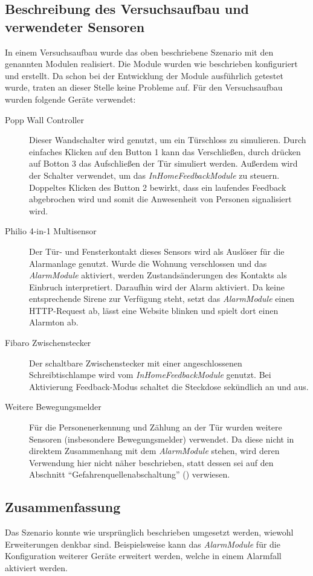 \subsection{Beschreibung des Versuchsaufbau und verwendeter Sensoren}
In einem Versuchsaufbau wurde das oben beschriebene Szenario mit den genannten Modulen realisiert. Die Module wurden wie beschrieben konfiguriert und erstellt. Da schon bei der Entwicklung der Module ausführlich getestet wurde, traten an dieser Stelle keine Probleme auf.
Für den Versuchsaufbau wurden folgende Geräte verwendet:

\begin{description}
	\item [Popp Wall Controller] Dieser Wandschalter wird genutzt, um ein Türschloss zu simulieren. Durch einfaches Klicken auf den Button 1 kann das Verschließen, durch drücken auf Botton 3 das Aufschließen der Tür simuliert werden. Außerdem wird der Schalter verwendet, um das \emph{InHomeFeedbackModule} zu steuern. Doppeltes Klicken des Button 2 bewirkt, dass ein laufendes Feedback abgebrochen wird und somit die Anwesenheit von Personen signalisiert wird.
	
	\item [Philio 4-in-1 Multisensor] Der Tür- und Fensterkontakt dieses Sensors wird als Auslöser für die Alarmanlage genutzt. Wurde die Wohnung verschlossen und das \emph{AlarmModule} aktiviert, werden Zustandsänderungen des Kontakts als Einbruch interpretiert. Daraufhin wird der Alarm aktiviert. Da keine entsprechende Sirene zur Verfügung steht, setzt das \emph{AlarmModule} einen HTTP-Request ab, lässt eine Website blinken und spielt dort einen Alarmton ab.
	
	\item [Fibaro Zwischenstecker] Der schaltbare Zwischenstecker mit einer angeschlossenen Schreibtischlampe wird vom \emph{InHomeFeedbackModule} genutzt. Bei Aktivierung Feedback-Modus schaltet die Steckdose sekündlich an und aus.
	
	\item [Weitere Bewegungsmelder] Für die Personenerkennung und Zählung an der Tür wurden weitere Sensoren (insbesondere Bewegungsmelder) verwendet. Da diese nicht in direktem Zusammenhang mit dem \emph{AlarmModule} stehen, wird deren Verwendung hier nicht näher beschrieben, statt dessen sei auf den Abschnitt "`Gefahrenquellenabschaltung"' () verwiesen.
\end{description}
\subsection{Zusammenfassung}
Das Szenario konnte wie ursprünglich beschrieben umgesetzt werden, wiewohl Erweiterungen denkbar sind. Beispielsweise kann das \emph{AlarmModule} für die Konfiguration weiterer Geräte erweitert werden, welche in einem Alarmfall aktiviert werden.

